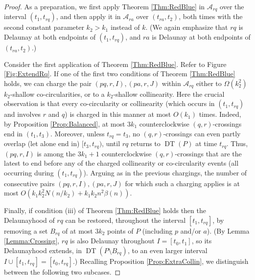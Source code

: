 \documentclass[letter,11pt]{article}
\def\A{\mathcal{A}}
\def\DT{\mathop{\mathrm{DT}}}
\begin{document}
\begin{proof}
As a preparation,
we first apply Theorem \ref{Thm:RedBlue} in $\A_{rq}$ over the interval $(t_1,t_{rq})$, and then apply it in $\A_{ra}$ over $(t_{ra},t_2)$, both times with the second constant parameter $k_2>k_1$ instead of $k$. (We again emphasize that $rq$ is Delaunay at both endpoints of $(t_1,t_{rq})$, and $ra$ is Delaunay at both endpoints of $(t_{ra},t_2)$.)

\smallskip
\noindent{\bf Charging events in $\A_{rq}$.}
Consider the first application of Theorem \ref{Thm:RedBlue}. Refer to Figure \ref{Fig:ExtendRq}.
If one of the first two conditions of Theorem \ref{Thm:RedBlue} holds, we can charge the pair $(pq,r,I),(pa,r,J)$ within $\A_{rq}$ either to $\Omega(k_2^2)$
$k_2$-shallow co-circularities, or to a $k_2$-shallow collinearity. Here the crucial observation is that every co-circularity or collinearity (which occurs in $(t_1,t_{rq})$ and involves $r$ and $q$) is charged in this manner at most $O(k_1)$ times. Indeed, by Proposition \ref{Prop:Balanced},
at most $3k_1$ counterclockwise $(q,r)$-crossings end in $(t_1,t_3)$. Moreover, unless $t_{rq}=t_3$, no $(q,r)$-crossings can even partly overlap (let alone end in) $[t_3,t_{rq})$, until $rq$ returns to $\DT(P)$ at time $t_{rq}$.
Thus, $(pq,r,I)$ is among the $3k_1+1$ counterclockwise $(q,r)$-crossings that are the latest to end before any of the charged collinearity or co-circularity events (all occurring during $(t_1,t_{rq})$). 
Arguing as in the previous chargings, the number of consecutive pairs $(pq,r,I), (pa,r,J)$ for which such a charging applies is at most $O(k_1k_2^2N(n/k_2)+k_1k_2n^2\beta(n))$.

Finally, if condition (iii) of Theorem \ref{Thm:RedBlue} holds then the Delaunayhood of $rq$ can be restored, throughout the interval $[t_1,t_{rq}]$, by removing a set $B_{rq}$ of at most $3k_2$ points of $P$ (including $p$ and/or $a$). (By Lemma \ref{Lemma:Crossing}, $rq$ is also Delaunay throughout $I=[t_0,t_1]$, so its Delaunayhood extends, in $\DT(P\setminus B_{rq})$, to an even larger interval $I\cup [t_1,t_{rq}]=[t_0,t_{rq}]$.)
Recalling Proposition \ref{Prop:ExtraCollin}, we distinguish between the following two subcases.


\end{proof}
\end{document}
